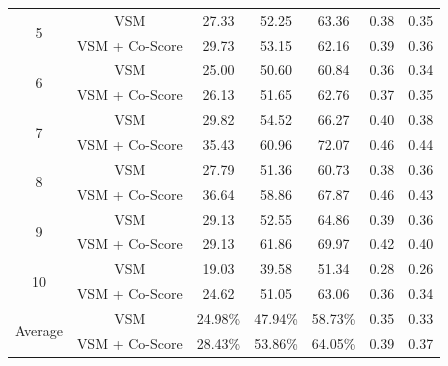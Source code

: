 \documentclass[conference]{IEEEtran}
\begin{document}
\begin{table}[htbp]
{\begin{tabular}{c|c|c|c|c|c|c}
			\multirow{2}{*}{5}                                                                               & VSM & 27.33 & 52.25 & 63.36 & 0.38 & 0.35 \\   \cline{2-7} &VSM + Co-Score                                                                       & 29.73                                                 & 53.15                                                 & 62.16                                                  &  0.39   & 0.36     \\  \hline
			\multirow{2}{*}{6}                                                                               & VSM & 25.00 & 50.60 & 60.84 & 0.36 & 0.34 \\  \cline{2-7}  &VSM + Co-Score 
			&26.13 &
			51.65 &
			62.76 & 0.37 &
			0.35     \\  \hline 
			\multirow{2}{*}{7}                                                                               & VSM & 29.82 & 54.52 & 66.27 & 0.40 & 0.38 \\  \cline{2-7}  &VSM + Co-Score 
			
			&35.43 &
			60.96 &
			72.07 & 0.46 &
			0.44     \\  \hline
			\multirow{2}{*}{8}                                                                               & VSM & 27.79 & 51.36 & 60.73 & 0.38 & 0.36 \\  \cline{2-7}  &VSM + Co-Score 
			&36.64 &
			58.86 &
			67.87 & 0.46 &
			0.43    \\  \hline
			\multirow{2}{*}{9}                                                                               & VSM & 29.13 & 52.55 & 64.86 & 0.39 & 0.36 \\  \cline{2-7}   &VSM + Co-Score 
			&29.13 &
			61.86 &
			69.97 & 0.42 &
			0.40    \\  \hline
			\multirow{2}{*}{10}                                                                               & VSM & 19.03 & 39.58 & 51.34 & 0.28 & 0.26 \\  \cline{2-7}  &VSM + Co-Score
			&24.62 &
			51.05 &
			63.06 & 0.36 &
			0.34    \\ \hline \hline
			\multirow{2}{*}{Average}                                                                               & VSM & 24.98\% & 47.94\% & 58.73\% & 0.35 & 0.33 \\  \cline{2-7}   &VSM + Co-Score      & 28.43\%                                                 & 53.86\%                                                 & 64.05\%                                                  &   0.39  &  0.37    \\ 
			\hline
	\end{tabular}}
	\centering
\end{table}
\end{document}
